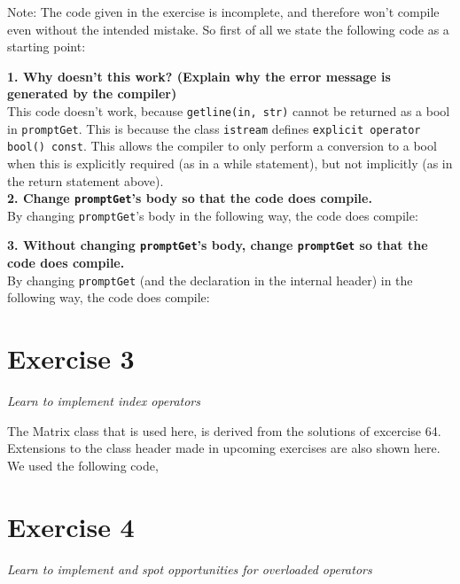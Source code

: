 \documentclass[12pt]{article}
\newcommand{\desc}[1]{\textit{#1} \vspace{1em}}
\begin{document}
Note: The code given in the exercise is incomplete, and therefore won't compile even without the intended mistake. So first of all we state the following code as a starting point:







\textbf{1. Why doesn't this work? (Explain why the error message is generated by the compiler)}\\
This code doesn't work, because \texttt{getline(in, str)} cannot be returned as a bool in \texttt{promptGet}. This is because the class \texttt{istream} defines \texttt{explicit operator bool() const}. This allows the compiler to only perform a conversion to a bool when this is explicitly required (as in a while statement), but not implicitly (as in the return statement above).\\

\textbf{2. Change \texttt{promptGet}'s body so that the code does compile.}\\
By changing \texttt{promptGet}'s body in the following way, the code does compile:


\textbf{3. Without changing \texttt{promptGet}'s body, change \texttt{promptGet} so that the code does compile.}\\
By changing \texttt{promptGet} (and the declaration in the internal header) in the following way, the code does compile:





\clearpage
\section*{Exercise 3}
\desc{Learn to implement index operators}

The Matrix class that is used here, is derived from the solutions of excercise 64. Extensions to the class header made in upcoming exercises are also shown here. \\

We used the following code,


\clearpage
\section*{Exercise 4}
\desc{Learn to implement and spot opportunities for overloaded operators}
\end{document}
